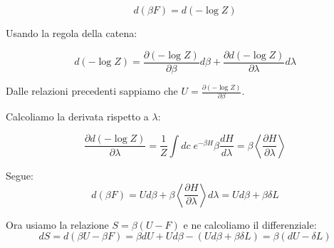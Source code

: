 \begin{equation}
d(\beta F) = d(- \log Z)
\end{equation}


Usando la regola della catena:

\begin{equation}
d(- \log Z) = \frac{\partial (- \log Z)}{\partial \beta} d\beta + \frac{\partial d(- \log Z)}{\partial \lambda} d\lambda
\end{equation}

Dalle relazioni precedenti sappiamo che $U=\frac{\partial (- \log Z)}{\partial \beta}$.

Calcoliamo la derivata rispetto a $\lambda$:

\begin{equation}
\frac{\partial d(- \log Z)}{\partial \lambda}= \frac{1}{Z} \int dc \;  e^{- \beta H} \beta \frac{d H}{d \lambda} = \beta \left\langle \frac{\partial H}{\partial \lambda} \right\rangle
\end{equation}

Segue:
\begin{equation}
d(\beta F) = U d\beta + \beta \left\langle \frac{\partial H}{\partial \lambda} \right\rangle d\lambda = U d\beta + \beta \delta L
\end{equation}

Ora usiamo la relazione $S = \beta(U-F)$ e ne calcoliamo il differenziale:
\begin{equation}
dS = d(\beta U - \beta F) = \beta dU + U d\beta - (U d\beta + \beta \delta L) = \beta (dU - \delta L)
\end{equation}




